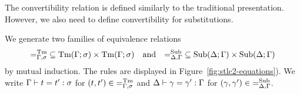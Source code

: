 The convertibility relation is defined similarly to the traditional presentation. However, we also need to define convertibility for substitutions.

\begin{defn}[Convertibility]
We generate two families of equivalence relations
\[ {=}_{\Gamma,\sigma}^\mathrm{Tm} \subseteq \mathrm{Tm}(\Gamma; \sigma) \times \mathrm{Tm}(\Gamma; \sigma) \quad\text{and}\quad
    {=}_{\Delta,\Gamma}^\mathrm{Sub} \subseteq \mathrm{Sub}(\Delta; \Gamma) \times \mathrm{Sub}(\Delta; \Gamma) \]
by mutual induction. The rules are displayed in Figure~\ref{fig:stlc2-equations}). We write $\Gamma \vdash t = t' : \sigma$ for $(t, t') \in {=}_{\Gamma,\sigma}^\mathrm{Tm}$ and $\Delta \vdash \gamma = \gamma' : \Gamma$ for $(\gamma, \gamma') \in {=}_{\Delta,\Gamma}^\mathrm{Sub}$.

\begin{figure}[t!]
\end{figure}
\end{defn}
